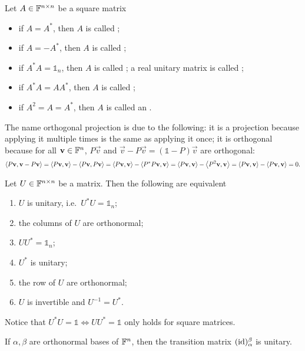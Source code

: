 \begin{definition}
Let $A\in\mathbb{F}^{n\times n}$ be a square matrix
\begin{itemize}
\item if $A=A^*$, then $A$ is called ;
\item if $A=-A^*$, then $A$ is called ;
\item if $A^*A=\mathbb{1}_n$, then $A$ is called ; a real unitary matrix is called ;
\item if $A^*A = AA^*$, then $A$ is called ;
\item if $A^2 = A = A^*$, then $A$ is called an .
\end{itemize}
\end{definition}
The name orthogonal projection is due to the following: it is a projection because applying it multiple times is the same as applying it once; it is orthogonal because for all $\boldsymbol{\mathrm{v}}\in\mathbb{F}^n$, $P\vec{v}$ and $\vec{v} - P\vec{v} = (\mathbb{1}-P)\vec{v}$ are orthogonal:
\[ \left\langle P\boldsymbol{\mathrm{v}},\boldsymbol{\mathrm{v}} - P\boldsymbol{\mathrm{v}} \right\rangle = \left\langle P\boldsymbol{\mathrm{v}},\boldsymbol{\mathrm{v}} \right\rangle - \left\langle P\boldsymbol{\mathrm{v}},P\boldsymbol{\mathrm{v}} \right\rangle = \left\langle P\boldsymbol{\mathrm{v}},\boldsymbol{\mathrm{v}} \right\rangle - \left\langle P^*P\boldsymbol{\mathrm{v}},\boldsymbol{\mathrm{v}} \right\rangle = \left\langle P\boldsymbol{\mathrm{v}},\boldsymbol{\mathrm{v}} \right\rangle - \left\langle P^2\boldsymbol{\mathrm{v}},\boldsymbol{\mathrm{v}} \right\rangle = \left\langle P\boldsymbol{\mathrm{v}},\boldsymbol{\mathrm{v}} \right\rangle - \left\langle P\boldsymbol{\mathrm{v}},\boldsymbol{\mathrm{v}} \right\rangle = 0. \]

\begin{lemma}
Let $U\in\mathbb{F}^{n\times n}$ be a matrix. Then the following are equivalent
\begin{enumerate}
\item $U$ is unitary, i.e.\ $U^*U=\mathbb{1}_n$;
\item the columns of $U$ are orthonormal;
\item $UU^*=\mathbb{1}_n$;
\item $U^*$ is unitary;
\item the row of $U$ are orthonormal;
\item $U$ is invertible and $U^{-1} = U^*$.
\end{enumerate}
\end{lemma}
Notice that $U^*U=\mathbb{1} \iff UU^*=\mathbb{1}$ only holds for square matrices.

\begin{corollary}
If $\alpha,\beta$ are orthonormal bases of $\mathbb{F}^{n}$, then the transition matrix $(\operatorname{id})_\alpha^\beta$ is unitary.
\end{corollary}

